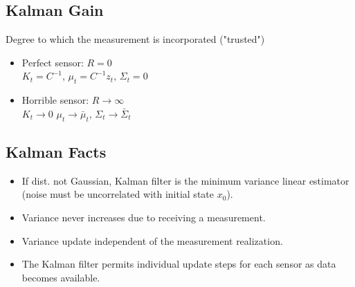 \subsection*{Kalman Gain}
Degree to which the measurement is incorporated ("trusted")
\begin{itemize}
  \item Perfect sensor: $R = 0$\\
    $K_t = C^{-1}$, $\mu_t = C^{-1} z_t$, $\Sigma_t = 0$
  \item Horrible sensor: $R \to \infty$\\
    $K_t \to 0$ $\mu_t \to \bar{\mu}_t$, $\Sigma_t \to \bar{\Sigma}_t$
\end{itemize}

\subsection*{Kalman Facts}
\begin{itemize}
  \item If dist. not Gaussian, Kalman filter is the minimum variance
    linear estimator (noise must be uncorrelated with initial state
    $x_0$).
  \item \alert{Variance never increases due to receiving a measurement}.
  \item \alert{Variance update independent of the measurement
    realization}.
  \item The Kalman filter permits individual update steps for each
    sensor as data becomes available.
\end{itemize}
